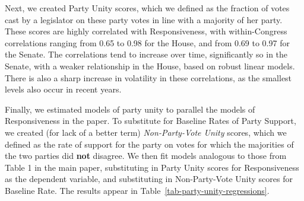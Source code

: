 \documentclass[12pt]{article}
\begin{document}
Next, we created Party Unity scores, which we defined as the fraction of votes
cast by a legislator on these party votes in line with a majority of her party.
These scores are highly correlated with Responsiveness, with within-Congress
correlations ranging from 0.65 to 0.98 for the House, and from 0.69 to 0.97 for
the Senate.
The correlations tend to increase over time, significantly so in the Senate,
with a weaker relationship in the House, based on robust linear models.
There is also a sharp increase in volatility in these correlations, as the
smallest levels also occur in recent years.

Finally, we estimated models of party unity to parallel the models of
Responsiveness in the paper.
To substitute for Baseline Rates of Party Support, we created (for lack of
a better term) \emph{Non-Party-Vote Unity} scores, which we defined as the rate
of support for the party on votes for which the majorities of the two parties
did \textbf{not} disagree.
We then fit models analogous to those from Table 1 in the main paper,
substituting in Party Unity scores for Responsiveness as the dependent variable,
and substituting in Non-Party-Vote Unity scores for Baseline Rate.
The results appear in Table~\ref{tab-party-unity-regressions}.
\end{document}
